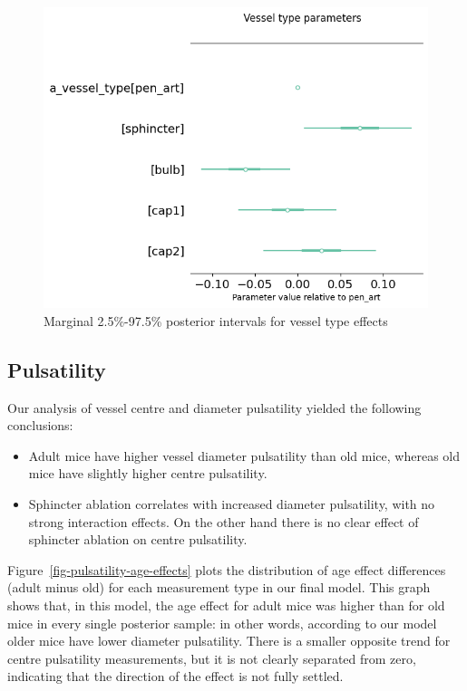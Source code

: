 \documentclass[
  letterpaper,
  DIV=11,
  numbers=noendperiod,
  oneside]{scrartcl}
\theoremstyle{plain}
\theoremstyle{remark}
\begin{document}
\begin{figure}

\begin{minipage}{\linewidth}

\includegraphics{../plots/whisker-vessel-type-effects.png}

\end{minipage}%

\caption{\label{fig-whisker-vessel-type-effects}Marginal 2.5\%-97.5\%
posterior intervals for vessel type effects}

\end{figure}%

\subsection{Pulsatility}\label{pulsatility}

Our analysis of vessel centre and diameter pulsatility yielded the
following conclusions:

\begin{itemize}
\item
  Adult mice have higher vessel diameter pulsatility than old mice,
  whereas old mice have slightly higher centre pulsatility.
\item
  Sphincter ablation correlates with increased diameter pulsatility,
  with no strong interaction effects. On the other hand there is no
  clear effect of sphincter ablation on centre pulsatility.
\end{itemize}

Figure~\ref{fig-pulsatility-age-effects} plots the distribution of age
effect differences (adult minus old) for each measurement type in our
final model. This graph shows that, in this model, the age effect for
adult mice was higher than for old mice in every single posterior
sample: in other words, according to our model older mice have lower
diameter pulsatility. There is a smaller opposite trend for centre
pulsatility measurements, but it is not clearly separated from zero,
indicating that the direction of the effect is not fully settled.
\end{document}
